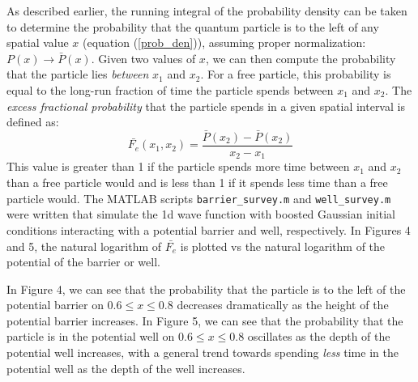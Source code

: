 \documentclass[10pt]{article}
\def\code#1{\texttt{#1}} %
\begin{document}
As described earlier, the running integral of the probability density can be taken to determine the 
probability that the quantum particle is to the left of any spatial value $x$
(equation (\ref{prob_den})), assuming proper normalization: $P(x) \rightarrow \bar{P}(x)$. 
Given two values of $x$, we can then compute the probability that the particle lies \textit{between}
$x_1$ and $x_2$. For a free particle, this probability is equal to the long-run fraction of time the 
particle spends between $x_1$ and $x_2$. The \textit{excess fractional probability} that the particle
spends in a given spatial interval is defined as:
\begin{equation}\label{Fe}
\bar{F_e}(x_1, x_2) = \frac{\bar{P}(x_2) - \bar{P}(x_2)}{x_2 - x_1}
\end{equation}
This value is greater than 1 if the particle spends more time between $x_1$ and $x_2$ than a free 
particle would and is less than 1 if it spends less time than a free particle would. The MATLAB 
scripts \code{barrier\_survey.m} and \code{well\_survey.m} were written that simulate the 1d 
wave function with boosted Gaussian initial conditions interacting with a potential barrier and well,
respectively. In Figures 4 and 5, the natural logarithm of $\bar{F_e}$ is plotted vs the natural 
logarithm of the potential of the barrier or well. 

In Figure 4, we can see that the probability that the particle is to the left of the potential 
barrier on $0.6 \leq x \leq 0.8$ decreases dramatically as the height of the potential barrier 
increases. In Figure 5, we can see that the probability that the particle is in the potential well
on $0.6 \leq x \leq 0.8$ oscillates as the depth of the potential well increases, with a general 
trend towards spending \textit{less} time in the potential well as the depth of the well increases.
\end{document}
